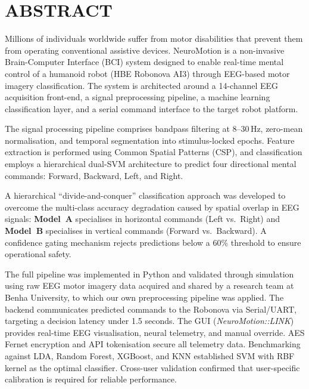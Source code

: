 \documentclass[12pt, a4paper, oneside]{report}
\begin{document}
\chapter*{ABSTRACT}

Millions of individuals worldwide suffer from motor disabilities that prevent them from
operating conventional assistive devices. NeuroMotion is a non-invasive Brain-Computer
Interface (BCI) system designed to enable real-time mental control of a humanoid robot
(HBE Robonova AI3) through EEG-based motor imagery classification. The system is
architected around a 14-channel EEG acquisition front-end, a signal preprocessing pipeline,
a machine learning classification layer, and a serial command interface to the target robot
platform.

The signal processing pipeline comprises bandpass filtering at 8--30\,Hz, zero-mean
normalisation, and temporal segmentation into stimulus-locked epochs. Feature extraction is
performed using Common Spatial Patterns (CSP), and classification employs a hierarchical
dual-SVM architecture to predict four directional mental commands: Forward, Backward,
Left, and Right.

A hierarchical ``divide-and-conquer'' classification approach was developed to overcome the
multi-class accuracy degradation caused by spatial overlap in EEG signals: \textbf{Model~A}
specialises in horizontal commands (Left vs.\ Right) and \textbf{Model~B} specialises in
vertical commands (Forward vs.\ Backward). A confidence gating mechanism rejects
predictions below a 60\% threshold to ensure operational safety.

The full pipeline was implemented in Python and validated through simulation using raw EEG
motor imagery data acquired and shared by a research team at Benha University, to which our
own preprocessing pipeline was applied. The backend communicates predicted commands to
the Robonova via Serial/UART, targeting a decision latency under 1.5 seconds. The GUI
(\textit{NeuroMotion::LINK}) provides real-time EEG visualisation, neural telemetry, and
manual override. AES Fernet encryption and API tokenisation secure all telemetry data.
Benchmarking against LDA, Random Forest, XGBoost, and KNN established SVM with RBF
kernel as the optimal classifier. Cross-user validation confirmed that user-specific calibration
is required for reliable performance.

\clearpage
\renewcommand{\contentsname}{TABLE OF CONTENTS}
\tableofcontents
\end{document}
